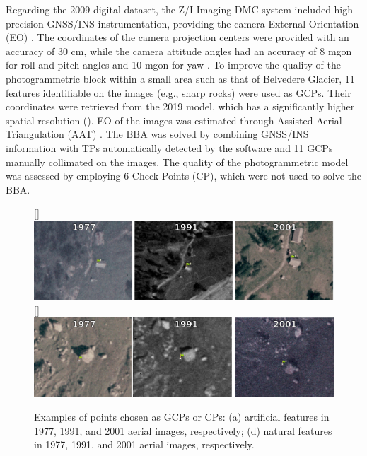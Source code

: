 Regarding the 2009 digital dataset, the Z/I-Imaging DMC system included high-precision GNSS/INS instrumentation, providing the camera External Orientation (EO) \citep{Hinz2001}. 
The coordinates of the camera projection centers were provided with an accuracy of 30 cm, while the camera attitude angles had an accuracy of 8 mgon for roll and pitch angles and 10 mgon for yaw \citep{Forlani_pinto2001}.
To improve the quality of the photogrammetric block within a small area such as that of Belvedere Glacier, 11 features identifiable on the images (e.g., sharp rocks) were used as GCPs. 
Their coordinates were retrieved from the 2019 model, which has a significantly higher spatial resolution (). 
EO of the images was estimated through Assisted Aerial Triangulation (AAT) \citep{ioli2021_lowcost_dgps}. 
The BBA was solved by combining GNSS/INS information with TPs automatically detected by the software and 11 GCPs manually collimated on the images. 
The quality of the photogrammetric model was assessed by employing 6 Check Points (CP), which were not used to solve the BBA. 

\begin{figure} [ht]
    \centering
    \subcaptionbox{\label{fig:2:gcp_examples:artificial}}[\textwidth]{
        \includegraphics[width=\textwidth]{artificial_gcps}
    } \\
    \subcaptionbox{\label{fig:2:gcp_examples:natural}}[\textwidth]{
        \includegraphics[width=\textwidth]{natural_gcps}
    }
    \caption{Examples of points chosen as GCPs or CPs: (a) artificial features in 1977, 1991, and 2001 aerial images, respectively; (d) natural features in 1977, 1991, and 2001 aerial images, respectively.}
    \label{fig:2:gcp_examples}
\end{figure}

